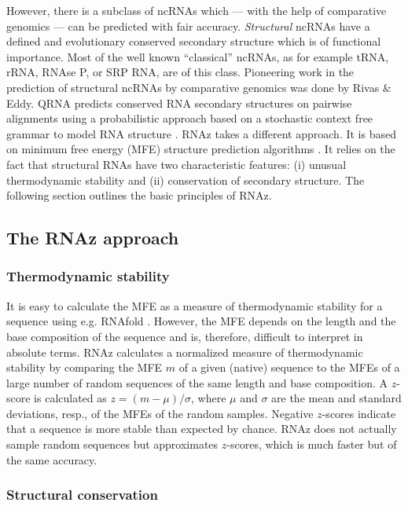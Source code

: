 \documentclass[11pt]{article}
\begin{document}
However, there is a subclass of ncRNAs which --- with the help of
comparative genomics --- can be predicted with fair accuracy.
\emph{Structural} ncRNAs have a defined and evolutionary conserved
secondary structure which is of functional importance. Most of the well
known ``classical'' ncRNAs, as for example tRNA, rRNA, RNAse P, or SRP RNA,
are of this class. Pioneering work in the prediction of structural ncRNAs
by comparative genomics was done by Rivas \& Eddy. QRNA predicts conserved
RNA secondary structures on pairwise alignments using a probabilistic
approach based on a stochastic context free grammar to model RNA structure
\cite{rivas01a,rivas01,mccutcheon03}. RNAz \cite{washietl05a} takes a
different approach. It is based on minimum free energy (MFE) structure
prediction algorithms \cite{zuker81,hofacker94a}. It relies on the fact
that structural RNAs have two characteristic features: (i) unusual
thermodynamic stability and (ii) conservation of secondary structure. The
following section outlines the basic principles of RNAz.

\subsection{The RNAz approach}

\subsubsection{Thermodynamic stability}
\label{sec:therm-stab}

It is easy to calculate the MFE as a measure of thermodynamic stability for
a sequence using e.g. RNAfold \cite{hofacker94a}. However, the MFE depends
on the length and the base composition of the sequence and is, therefore,
difficult to interpret in absolute terms. RNAz calculates a normalized
measure of thermodynamic stability by comparing the MFE $m$ of a given
(native) sequence to the MFEs of a large number of random sequences of the
same length and base composition. A $z$-score is calculated as
$z=(m-\mu)/\sigma$, where $\mu$ and $\sigma$ are the mean and standard
deviations, resp., of the MFEs of the random samples. Negative $z$-scores
indicate that a sequence is more stable than expected by chance.  RNAz does
not actually sample random sequences but approximates $z$-scores, which is
much faster but of the same accuracy.

\subsubsection{Structural conservation}
\label{sec:struct-cons}
\end{document}

